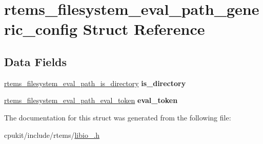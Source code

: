 \hypertarget{structrtems__filesystem__eval__path__generic__config}{}\section{rtems\+\_\+filesystem\+\_\+eval\+\_\+path\+\_\+generic\+\_\+config Struct Reference}
\label{structrtems__filesystem__eval__path__generic__config}
\subsection*{Data Fields}
\begin{DoxyCompactItemize}
\item 
\mbox{\label{structrtems__filesystem__eval__path__generic__config_adee8a7d0d9f6027fc9a948d82985c373}} 
\mbox{\hyperlink{group__LibIOInternal_ga163c6e729278f5dd69c324f462ef4e59}{rtems\+\_\+filesystem\+\_\+eval\+\_\+path\+\_\+is\+\_\+directory}} {\bfseries is\+\_\+directory}
\item 
\mbox{\label{structrtems__filesystem__eval__path__generic__config_ab21e8f0f36115e9c2644137103743c02}} 
\mbox{\hyperlink{group__LibIOInternal_gae436fc8f66ede6cf15f46c38ea8958b0}{rtems\+\_\+filesystem\+\_\+eval\+\_\+path\+\_\+eval\+\_\+token}} {\bfseries eval\+\_\+token}
\end{DoxyCompactItemize}


The documentation for this struct was generated from the following file\+:\begin{DoxyCompactItemize}
\item 
cpukit/include/rtems/\mbox{\hyperlink{libio___8h}{libio\+\_\+.\+h}}\end{DoxyCompactItemize}
